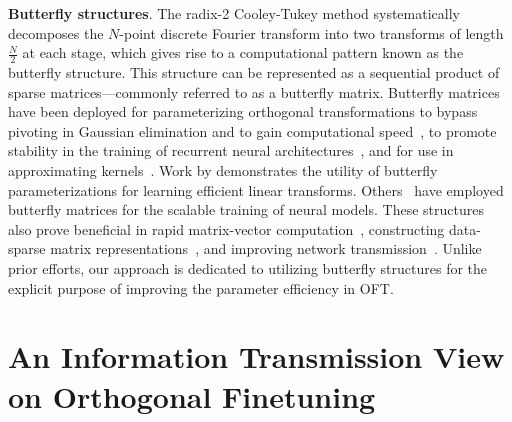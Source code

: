 \textbf{Butterfly structures}. The radix-2 Cooley-Tukey method systematically decomposes the $N$-point discrete Fourier transform into two transforms of length $\frac{N}{2}$ at each stage, which gives rise to a computational pattern known as the butterfly structure. This structure can be represented as a sequential product of sparse matrices—commonly referred to as a butterfly matrix. Butterfly matrices have been deployed for parameterizing orthogonal transformations to bypass pivoting in Gaussian elimination and to gain computational speed~\cite{parker1995random}, to promote stability in the training of recurrent neural architectures~\cite{jing2017tunable}, and for use in approximating kernels~\cite{munkhoeva2018quadrature}. Work by \cite{dao2019learning,dao2019kaleidoscope} demonstrates the utility of butterfly parameterizations for learning efficient linear transforms. Others~\cite{chen2022pixelated,dao2022monarch} have employed butterfly matrices for the scalable training of neural models. These structures also prove beneficial in rapid matrix-vector computation~\cite{michielssen1996multilevel,o2010algorithm}, constructing data-sparse matrix representations~\cite{li2015butterfly}, and improving network transmission~\cite{klasing1994broadcasting,li2003linear,rajasingh2016transmission}. Unlike prior efforts, our approach is dedicated to utilizing butterfly structures for the explicit purpose of improving the parameter efficiency in OFT.

\section{An Information Transmission View on Orthogonal Finetuning}

